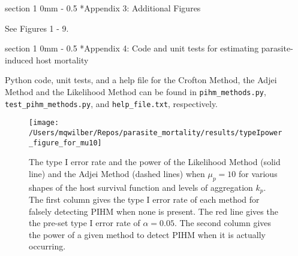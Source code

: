\documentclass[12pt, a4paper]{article}
\makeatletter
\renewcommand{\section}{\@startsection
{section}%
{1}%
{0mm}%
{-\baselineskip}%
{0.5\baselineskip}%
{\normalfont\bf\large}} %
\makeatother
\begin{document}


\section*{Appendix 3: Additional Figures}

See Figures 1 - 9.

\section*{Appendix 4: Code and unit tests for estimating parasite-induced host mortality}

Python code, unit tests, and a help file for the Crofton Method, the Adjei Method and the Likelihood Method can be found in \verb*#pihm_methods.py#, \verb*#test_pihm_methods.py#, and \verb*#help_file.txt#, respectively.


\singlespacing



\begin{figure}

    \texttt{[image: /Users/mqwilber/Repos/parasite\_mortality/results/typeIpower\_figure\_for\_mu10]}

    \caption{The type I error rate and the power of the Likelihood Method (solid line) and the Adjei Method (dashed lines) when $\mu_p = 10$ for various shapes of the host survival function and levels of aggregation $k_p$.  The first column gives the type I error rate of each method for falsely detecting PIHM when none is present.  The red line gives the the pre-set type I error rate of $\alpha = 0.05$.  The second column gives the power of a given method to detect PIHM when it is actually occurring. }
    \label{fig:typeI10}

\end{figure}
\end{document}
